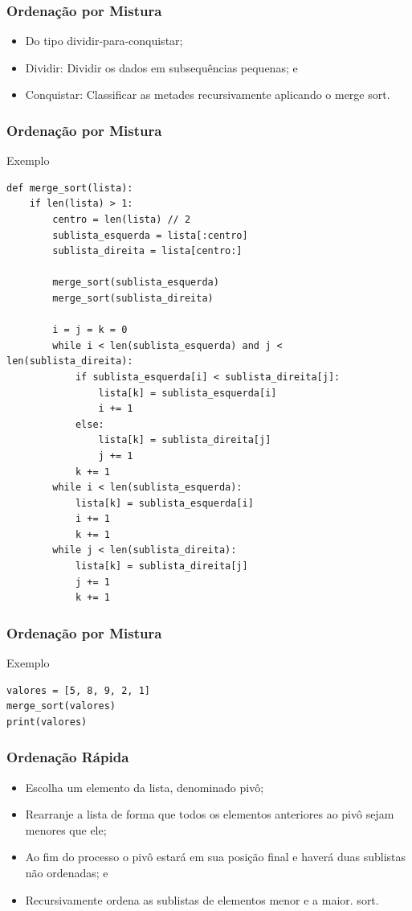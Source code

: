 \documentclass{beamer}
\begin{document}
\begin{frame}
\frametitle{Ordenação por Mistura}

\begin{itemize}
	\item Do tipo dividir-para-conquistar;
	\item Dividir: Dividir os dados em subsequências pequenas; e
	\item Conquistar: Classificar as metades recursivamente aplicando o merge
	sort.
\end{itemize}
\end{frame}

\begin{frame}[fragile]
\frametitle{Ordenação por Mistura}

\begin{exampleblock}{Exemplo}
	\begin{lstlisting}
def merge_sort(lista):
    if len(lista) > 1:
        centro = len(lista) // 2
        sublista_esquerda = lista[:centro]
        sublista_direita = lista[centro:]

        merge_sort(sublista_esquerda)
        merge_sort(sublista_direita)

        i = j = k = 0
        while i < len(sublista_esquerda) and j < len(sublista_direita):
            if sublista_esquerda[i] < sublista_direita[j]:
                lista[k] = sublista_esquerda[i]
                i += 1
            else:
                lista[k] = sublista_direita[j]
                j += 1
            k += 1
        while i < len(sublista_esquerda):
            lista[k] = sublista_esquerda[i]
            i += 1
            k += 1
        while j < len(sublista_direita):
            lista[k] = sublista_direita[j]
            j += 1
            k += 1
	\end{lstlisting}
\end{exampleblock}
\end{frame}

\begin{frame}[fragile]
\frametitle{Ordenação por Mistura}

\begin{exampleblock}{Exemplo}
	\begin{lstlisting}
valores = [5, 8, 9, 2, 1]
merge_sort(valores)
print(valores)
	\end{lstlisting}
\end{exampleblock}
\end{frame}

\begin{frame}
\frametitle{Ordenação Rápida}

\begin{itemize}
	\item Escolha um elemento da lista, denominado pivô;
	\item Rearranje a lista de forma que todos os elementos anteriores ao pivô
	sejam menores que ele;
	\item Ao fim do processo o pivô estará em sua posição final e haverá duas
	sublistas não ordenadas; e
	\item Recursivamente ordena as sublistas de elementos menor e a maior.
	sort.
\end{itemize}
\end{frame}
\end{document}

